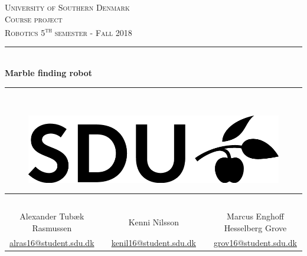 \documentclass[../Head/Main.tex]{subfiles}
\begin{document}
\begin{titlepage}
\begin{center}
\textsc{\LARGE University of Southern Denmark}\\[1.25cm]

\textsc{Course project}\\[0.35cm]

\textsc{\large Robotics 5\textsuperscript{th} semester - Fall 2018}\\[0.35cm]
\rule{\linewidth}{0.5mm}\\[0.35cm]
{ \LARGE \bfseries Marble finding robot\\[0.35cm]}
\rule{\linewidth}{0.5mm}\\[1cm]

\vspace{3cm}

    \begin{figure}[h!]
    \centering
    \includegraphics[scale=1]{../Figures/SDUlogo}
    \label{fig:SDUlogo}\\
    [2.5cm]
    \end{figure}

\begin{tabular}{c c c c c}
    \\
    \\
    \\
    \\
    \\
    \\
    \cline{1-1}\cline{3-3}\cline{5-5}
    Alexander Tubæk Rasmussen & & Kenni Nilsson & & Marcus Enghoff Hesselberg Grove \\
    \href{mailto:alras16@student.sdu.dk}{alras16@student.sdu.dk} & & \href{mailto:kenil16@student.sdu.dk}{kenil16@student.sdu.dk} & &
    \href{mailto:mgrov16@student.sdu.dk}{grov16@student.sdu.dk}
    \\
\end{tabular}	

\vfill


\end{center}
\end{titlepage}
\end{document}
